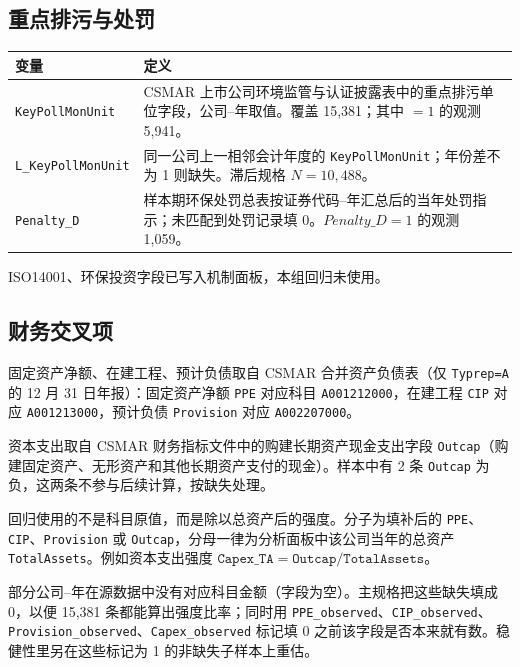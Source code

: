\documentclass[11pt]{article}
\begin{document}
\subsection{重点排污与处罚}

\begin{center}
\begin{threeparttable}
\caption{重点排污与处罚变量}
\begin{tabular}{lp{10.6cm}}
\toprule
变量 & 定义 \\
\midrule
\texttt{KeyPollMonUnit} & CSMAR 上市公司环境监管与认证披露表中的重点排污单位字段，公司--年取值。覆盖 15,381；其中 \(=1\) 的观测 5,941。 \\
\texttt{L\_KeyPollMonUnit} & 同一公司上一相邻会计年度的 \texttt{KeyPollMonUnit}；年份差不为 1 则缺失。滞后规格 \(N=10{,}488\)。 \\
\texttt{Penalty\_D} & 样本期环保处罚总表按证券代码--年汇总后的当年处罚指示；未匹配到处罚记录填 0。\(Penalty\_D=1\) 的观测 1,059。 \\
\bottomrule
\end{tabular}
\end{threeparttable}
\end{center}

ISO14001、环保投资字段已写入机制面板，本组回归未使用。

\subsection{财务交叉项}

固定资产净额、在建工程、预计负债取自 CSMAR 合并资产负债表（仅 \texttt{Typrep=A} 的 12 月 31 日年报）：固定资产净额 \texttt{PPE} 对应科目 \texttt{A001212000}，在建工程 \texttt{CIP} 对应 \texttt{A001213000}，预计负债 \texttt{Provision} 对应 \texttt{A002207000}。

资本支出取自 CSMAR 财务指标文件中的购建长期资产现金支出字段 \texttt{Outcap}（购建固定资产、无形资产和其他长期资产支付的现金）。样本中有 2 条 \texttt{Outcap} 为负，这两条不参与后续计算，按缺失处理。

回归使用的不是科目原值，而是除以总资产后的强度。分子为填补后的 \texttt{PPE}、\texttt{CIP}、\texttt{Provision} 或 \texttt{Outcap}，分母一律为分析面板中该公司当年的总资产 \texttt{TotalAssets}。例如资本支出强度 \(\texttt{Capex\_TA}=\texttt{Outcap}/\texttt{TotalAssets}\)。

部分公司--年在源数据中没有对应科目金额（字段为空）。主规格把这些缺失填成 0，以便 15,381 条都能算出强度比率；同时用 \texttt{PPE\_observed}、\texttt{CIP\_observed}、\texttt{Provision\_observed}、\texttt{Capex\_observed} 标记填 0 之前该字段是否本来就有数。稳健性里另在这些标记为 1 的非缺失子样本上重估。
\end{document}
